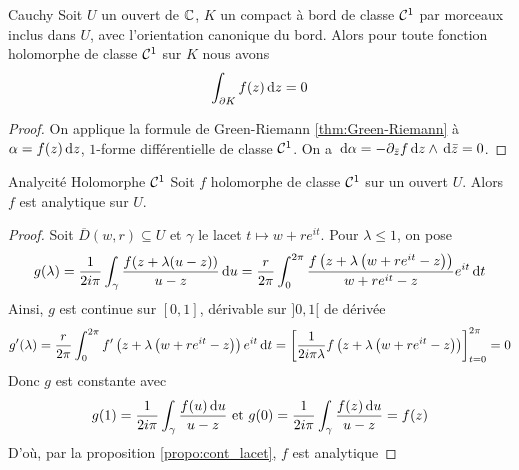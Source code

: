 \documentclass{cours}
\begin{document}
\begin{théorème}{Cauchy}{}
    Soit $U$ un ouvert de $\mathbb{C}$, $K$ un compact à bord de classe $\mathcal{C}^{1}$ par morceaux inclus dans $U$, avec l'orientation canonique du bord. Alors pour toute fonction holomorphe de classe $\mathcal{C}^{1}$ sur $K$ nous avons 
    \[
        \int_{\partial K}f(z){\rm \, d} z = 0
    \]
\end{théorème}
\begin{proof}
    On applique la formule de Green-Riemann \ref{thm:Green-Riemann} à $\alpha = f(z){\rm \, d} z$, $1$-forme différentielle de classe $\mathcal{C}^{1}$. On a ${\rm \, d} \alpha = -\partial_{\bar{z}}f{\rm \, d} z \land {\rm \, d} \bar{z} = 0$.
\end{proof}
\begin{corollaire}{Analycité Holomorphe $\mathcal{C}^{1}$}{}
    Soit $f$ holomorphe de classe $\mathcal{C}^{1}$ sur un ouvert $U$. Alors $f$ est analytique sur $U$. 
\end{corollaire}
\begin{proof}
    Soit $\overline{D}(w, r) \subseteq U$ et $\gamma$ le lacet $t \mapsto w + re^{it}$. Pour $\lambda \leq 1$, on pose
    \[
        g(\lambda) = \frac{1}{2i\pi}\int_{\gamma}\frac{f(z + \lambda(u - z))}{u - z} {\rm \, d} u = \frac{r}{2\pi}\int_{0}^{2\pi}\frac{f\left(z +\lambda\left(w + re^{it} - z\right)\right)}{w + re^{it} - z}e^{it}{\rm \, d} t
    \]
    Ainsi, $g$ est continue sur $[0, 1]$, dérivable sur $]0, 1[$ de dérivée 
    \[
        g'(\lambda) = \frac{r}{2\pi}\int_{0}^{2\pi}f'\left(z + \lambda\left(w + re^{it} - z\right)\right)e^{it}{\rm \, d} t = \left[\frac{1}{2i\pi\lambda}f\left(z + \lambda\left(w + re^{it} - z\right)\right)\right]_{t = 0}^{2\pi} = 0
    \]
    Donc $g$ est constante avec 
    \[
        g(1) = \frac{1}{2i\pi}\int_{\gamma}^{}\frac{f(u){\rm \, d} u}{u - z} \text{ et } g(0) = \frac{1}{2i\pi}\int_{\gamma}\frac{f(z){\rm \, d} u}{u - z} = f(z)
    \]
    D'où, par la proposition \ref{propo:cont_lacet}, $f$ est analytique 
\end{proof}
\end{document}
